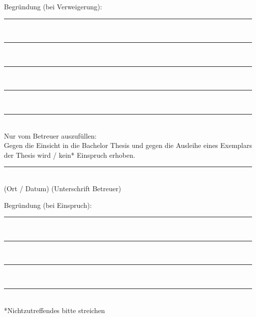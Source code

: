 Begr\"undung (bei Verweigerung): \\[5ex]
\rule[0ex]{\textwidth}{0.4pt} \\[2ex]
\rule[0ex]{\textwidth}{0.4pt} \\[2ex]
\rule[0ex]{\textwidth}{0.4pt} \\[2ex]
\rule[0ex]{\textwidth}{0.4pt} \\[2ex]
\rule[0ex]{\textwidth}{0.4pt} \\[5ex]
Nur vom Betreuer auszuf\"ullen: \\[2ex]
Gegen die Einsicht in die Bachelor Thesis  und gegen die Ausleihe eines Exemplars der Thesis wird / kein* Einspruch 
erhoben.
\par \vspace{10mm}
\rule[0ex]{\textwidth}{0.4pt}\\
(Ort / Datum)\hspace{30ex} (Unterschrift Betreuer)
\par
Begr\"undung (bei Einspruch): \\[5ex]
\rule[0ex]{\textwidth}{0.4pt} \\[2ex]
\rule[0ex]{\textwidth}{0.0pt} \\[2ex]
\rule[0ex]{\textwidth}{0.4pt} \\[2ex]
\rule[0ex]{\textwidth}{0.4pt} \\[5ex]
*Nichtzutreffendes bitte streichen
%
